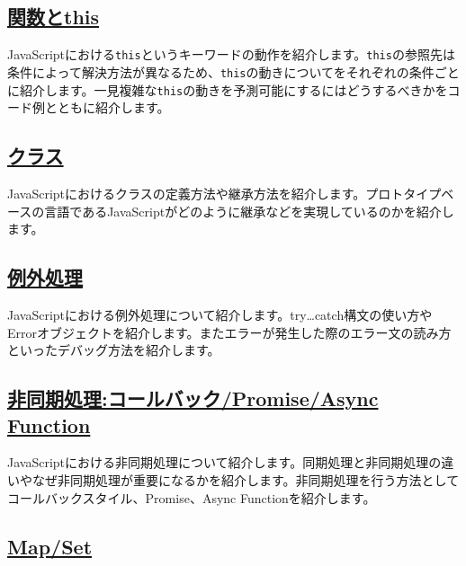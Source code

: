 \hypertarget{function-this}{%
\subsection*{\texorpdfstring{\href{./function-this/README.md}{関数とthis}}{関数とthis}}\label{function-this}}

JavaScriptにおける\texttt{this}というキーワードの動作を紹介します。\texttt{this}の参照先は条件によって解決方法が異なるため、\texttt{this}の動きについてをそれぞれの条件ごとに紹介します。一見複雑な\texttt{this}の動きを予測可能にするにはどうするべきかをコード例とともに紹介します。

\hypertarget{class}{%
\subsection*{\texorpdfstring{\href{./class/README.md}{クラス}}{クラス}}\label{class}}

JavaScriptにおけるクラスの定義方法や継承方法を紹介します。プロトタイプベースの言語であるJavaScriptがどのように継承などを実現しているのかを紹介します。

\hypertarget{error-try-catch}{%
\subsection*{\texorpdfstring{\href{./error-try-catch/README.md}{例外処理}}{例外処理}}\label{error-try-catch}}

JavaScriptにおける例外処理について紹介します。try\ldots{}catch構文の使い方やErrorオブジェクトを紹介します。またエラーが発生した際のエラー文の読み方といったデバッグ方法を紹介します。

\hypertarget{async}{%
\subsection*{\texorpdfstring{\href{./async/README.md}{非同期処理:コールバック/Promise/Async
Function}}{非同期処理:コールバック/Promise/Async Function}}\label{async}}

JavaScriptにおける非同期処理について紹介します。同期処理と非同期処理の違いやなぜ非同期処理が重要になるかを紹介します。非同期処理を行う方法としてコールバックスタイル、Promise、Async
Functionを紹介します。

\hypertarget{map-and-set}{%
\subsection*{\texorpdfstring{\href{./map-and-set/README.md}{Map/Set}}{Map/Set}}\label{map-and-set}}

